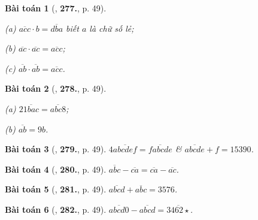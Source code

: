 \documentclass{article}
\numberwithin{equation}{section}
\newtheorem{baitoan}{Bài toán}
\begin{document}
\begin{baitoan}[\cite{Binh_Toan_6_tap_1}, \textbf{277.}, p. 49]
	\begin{enumerate*}
		\item[(a)] $\overline{acc}\cdot b = \overline{dba}$ biết $a$ là chữ số lẻ;
		\item[(b)] $\overline{ac}\cdot\overline{ac} = \overline{acc}$;
		\item[(c)] $\overline{ab}\cdot\overline{ab} = \overline{acc}$.
	\end{enumerate*}
\end{baitoan}

\begin{baitoan}[\cite{Binh_Toan_6_tap_1}, \textbf{278.}, p. 49]
	\begin{enumerate*}
		\item[(a)] $2\overline{1bac} = \overline{abc8}$;
		\item[(b)] $\overline{ab} = 9b$.
	\end{enumerate*}
\end{baitoan}

\begin{baitoan}[\cite{Binh_Toan_6_tap_1}, \textbf{279.}, p. 49]
	$4\overline{abcdef} = \overline{fabcde}$ \& $\overline{abcde} + f = 15390$.
\end{baitoan}

\begin{baitoan}[\cite{Binh_Toan_6_tap_1}, \textbf{280.}, p. 49]
	$\overline{abc} - \overline{ca} = \overline{ca} - \overline{ac}$.
\end{baitoan}

\begin{baitoan}[\cite{Binh_Toan_6_tap_1}, \textbf{281.}, p. 49]
	$\overline{abcd} + \overline{abc} = 3576$.
\end{baitoan}

\begin{baitoan}[\cite{Binh_Toan_6_tap_1}, \textbf{282.}, p. 49]
	$\overline{abcd0} - \overline{abcd} = \overline{3462\star}$.
\end{baitoan}
\end{document}
